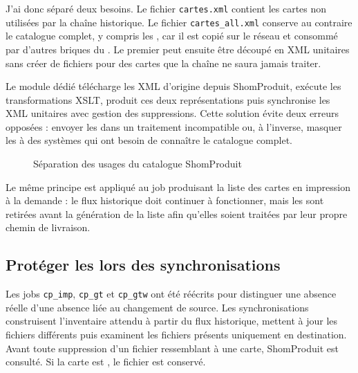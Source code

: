 J'ai donc séparé deux besoins. Le fichier \texttt{cartes.xml} contient les cartes non  utilisées par la chaîne historique. Le fichier \texttt{cartes\_all.xml} conserve au contraire le catalogue complet, y compris les , car il est copié sur le réseau et consommé par d'autres briques du . Le premier peut ensuite être découpé en XML unitaires sans créer de fichiers pour des cartes que la chaîne  ne saura jamais traiter.

Le module dédié télécharge les XML d'origine depuis ShomProduit, exécute les transformations XSLT, produit ces deux représentations puis synchronise les XML unitaires avec gestion des suppressions. Cette solution évite deux erreurs opposées : envoyer les  dans un traitement incompatible ou, à l'inverse, masquer les  à des systèmes qui ont besoin de connaître le catalogue complet.

\begin{figure}[H]
\centering
{}
\caption{Séparation des usages du catalogue ShomProduit}
\label{fig:separation-shomproduit}
\end{figure}

Le même principe est appliqué au job produisant la liste des cartes en impression à la demande : le flux historique doit continuer à fonctionner, mais les  sont retirées avant la génération de la liste afin qu'elles soient traitées par leur propre chemin de livraison.

\subsection{Protéger les  lors des synchronisations}

Les jobs \texttt{cp\_imp}, \texttt{cp\_gt} et \texttt{cp\_gtw} ont été réécrits pour distinguer une absence réelle d'une absence liée au changement de source. Les synchronisations construisent l'inventaire attendu à partir du flux historique, mettent à jour les fichiers différents puis examinent les fichiers présents uniquement en destination. Avant toute suppression d'un fichier ressemblant à une carte, ShomProduit est consulté. Si la carte est , le fichier est conservé.

